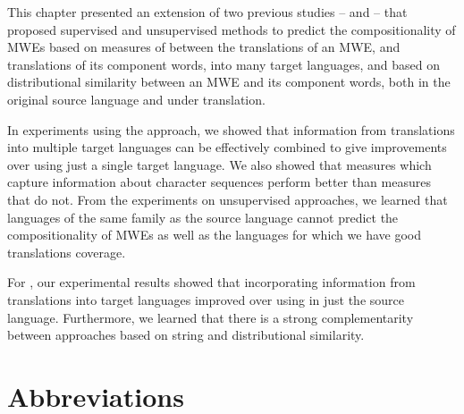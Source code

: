 \documentclass[output=paper,modfonts,nonflat]{langsci/langscibook}
\begin{document}

This chapter presented an extension of two previous studies --
\cite{salehi2013} and \cite{DBLP:conf/eacl/SalehiCB14} -- that
proposed supervised and unsupervised methods to predict the
compositionality of MWEs based on measures of 
between the translations of an MWE, and translations of its component
words, into many target languages, and based on distributional
similarity between an MWE and its component words, both in the
original source language and under translation.

In experiments using the  approach, we showed that
information from translations into multiple target languages can be
effectively combined to give improvements over using just a single
target language. We also showed that  measures which
capture information about character sequences perform better than
measures that do not. From the experiments on unsupervised approaches,
we learned that languages of the same family as the source language
cannot predict the compositionality of MWEs as well as the languages
for which we have good translations coverage.

For , our experimental results showed that
incorporating information from translations into target languages
improved over using  in just the source
language. Furthermore, we learned that there is a strong
complementarity between approaches based on string and distributional
similarity.






\section*{Abbreviations}
\end{document}
